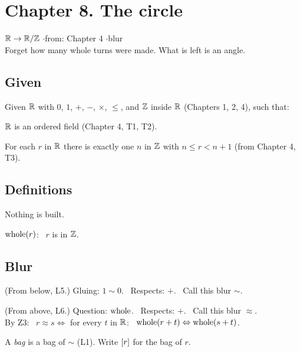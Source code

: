 \newpage

\section*{Chapter 8. The circle}
\begin{center}
{\normalsize $\mathbb{R} \to \mathbb{R}/\mathbb{Z}$ \quad$\cdot$\quad from: Chapter 4 \quad$\cdot$\quad blur}\\[4pt]
{\small Forget how many whole turns were made. What is left is an angle.}
\end{center}

\subsection*{Given}

Given $\mathbb{R}$ with $0$, $1$, $+$, $-$, $\times$, $\le$, and $\mathbb{Z}$ inside $\mathbb{R}$ (Chapters 1, 2, 4), such that:
\begin{lines}
\item[\lab{G1}] $\mathbb{R}$ is an ordered field (Chapter 4, T1, T2).
\item[\lab{G2}] For each $r$ in $\mathbb{R}$ there is exactly one $n$ in $\mathbb{Z}$ with $n \le r < n + 1$ (from Chapter 4, T3).
\end{lines}

\subsection*{Definitions}

Nothing is built.
\begin{lines}
\item[\lab{D1}] $\operatorname{whole}(r)$: \ $r$ is in $\mathbb{Z}$.
\end{lines}

\subsection*{Blur}

\begin{lines}
\item[\lab{B1}] (From below, L5.) Gluing: $1 \sim 0$. \ Respects: $+$. \ Call this blur $\sim$.
\item[\lab{B2}] (From above, L6.) Question: $\operatorname{whole}$. \ Respects: $+$. \ Call this blur $\approx$. \\
By Z3: \ $r \approx s \iff$ for every $t$ in $\mathbb{R}$: \ $\operatorname{whole}(r + t) \Leftrightarrow \operatorname{whole}(s + t)$.
\item[] A \emph{bag} is a bag of $\sim$ (L1). Write $[r]$ for the bag of $r$.
\end{lines}

